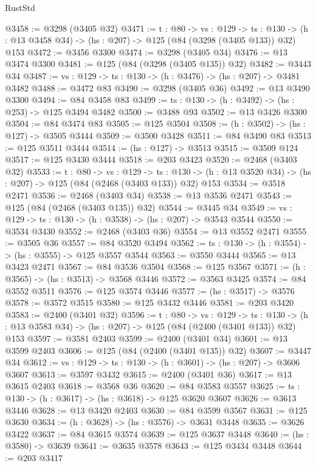 \begin{lexlean}{RustStd}
\begin{coremodule}
@3458 := @3298 (@3405 @32)
@3471 := {t : @80} ->
  {vs : @129} ->
  {ts : @130} -> (h : @13 @3458 @34) -> (hs : @207) -> @125 (@84 (@3298 (@3405 @133)) @32) @153
@3472 := @3456 @3300
@3474 := @3298 (@3405 @34)
@3476 := @13 @3474 @3300
@3481 := @125 (@84 (@3298 (@3405 @135)) @32)
@3482 := @3443 @34
@3487 := {vs : @129} -> {ts : @130} -> (h : @3476) -> (hs : @207) -> @3481 @3482
@3488 := @3472 @83
@3490 := @3298 (@3405 @36)
@3492 := @13 @3490 @3300
@3494 := @84 @3458 @83
@3499 := {ts : @130} -> (h : @3492) -> (hs : @253) -> @125 @3494 @3482
@3500 := @3488 @93
@3502 := @13 @3426 @3300
@3504 := @84 @3474 @83
@3505 := @125 @3504
@3508 := (h : @3502) -> (hs : @127) -> @3505 @3444
@3509 := @3500 @3428
@3511 := @84 @3490 @83
@3513 := @125 @3511 @3444
@3514 := (hs : @127) -> @3513
@3515 := @3509 @124
@3517 := @125 @3430 @3444
@3518 := @203 @3423
@3520 := @2468 (@3403 @32)
@3533 := {t : @80} ->
  {vs : @129} ->
  {ts : @130} -> (h : @13 @3520 @34) -> (hs : @207) -> @125 (@84 (@2468 (@3403 @133)) @32) @153
@3534 := @3518 @2471
@3536 := @2468 (@3403 @34)
@3538 := @13 @3536 @2471
@3543 := @125 (@84 (@2468 (@3403 @135)) @32)
@3544 := @3445 @34
@3549 := {vs : @129} -> {ts : @130} -> (h : @3538) -> (hs : @207) -> @3543 @3544
@3550 := @3534 @3430
@3552 := @2468 (@3403 @36)
@3554 := @13 @3552 @2471
@3555 := @3505 @36
@3557 := @84 @3520 @3494
@3562 := {ts : @130} -> (h : @3554) -> (hs : @3555) -> @125 @3557 @3544
@3563 := @3550 @3444
@3565 := @13 @3423 @2471
@3567 := @84 @3536 @3504
@3568 := @125 @3567
@3571 := (h : @3565) -> (hs : @3513) -> @3568 @3446
@3572 := @3563 @3425
@3574 := @84 @3552 @3511
@3576 := @125 @3574 @3446
@3577 := (hs : @3517) -> @3576
@3578 := @3572 @3515
@3580 := @125 @3432 @3446
@3581 := @203 @3420
@3583 := @2400 (@3401 @32)
@3596 := {t : @80} ->
  {vs : @129} ->
  {ts : @130} -> (h : @13 @3583 @34) -> (hs : @207) -> @125 (@84 (@2400 (@3401 @133)) @32) @153
@3597 := @3581 @2403
@3599 := @2400 (@3401 @34)
@3601 := @13 @3599 @2403
@3606 := @125 (@84 (@2400 (@3401 @135)) @32)
@3607 := @3447 @34
@3612 := {vs : @129} -> {ts : @130} -> (h : @3601) -> (hs : @207) -> @3606 @3607
@3613 := @3597 @3432
@3615 := @2400 (@3401 @36)
@3617 := @13 @3615 @2403
@3618 := @3568 @36
@3620 := @84 @3583 @3557
@3625 := {ts : @130} -> (h : @3617) -> (hs : @3618) -> @125 @3620 @3607
@3626 := @3613 @3446
@3628 := @13 @3420 @2403
@3630 := @84 @3599 @3567
@3631 := @125 @3630
@3634 := (h : @3628) -> (hs : @3576) -> @3631 @3448
@3635 := @3626 @3422
@3637 := @84 @3615 @3574
@3639 := @125 @3637 @3448
@3640 := (hs : @3580) -> @3639
@3641 := @3635 @3578
@3643 := @125 @3434 @3448
@3644 := @203 @3417

\end{coremodule}
\end{lexlean}
